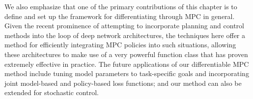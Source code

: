 We also emphasize that one of the primary contributions of this chapter is
to define and set up the framework for differentiating through MPC in general.
Given the recent prominence of attempting to incorporate planning and
control methods into the loop of deep network architectures, the techniques here
offer a method for efficiently integrating MPC policies into such situations,
allowing these architectures to make use of a very powerful function class that
has proven extremely effective in practice.
The future applications of our differentiable MPC method include
tuning model parameters to task-specific goals and
incorporating joint model-based and policy-based loss functions;
and our method can also be extended for stochastic control.

